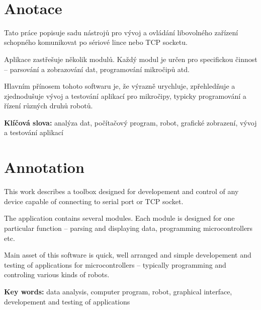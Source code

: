 \documentclass[12pt, a4paper, oneside]{article}
\newcommand{\D}{\medskip \noindent} %
\newcommand{\B}{\textbf} %
\begin{document}
\newpage   %
~ %
\vspace{10mm}

\section*{Anotace}


Tato práce popisuje sadu nástrojů pro vývoj a ovládání libovolného zařízení schopného komunikovat po sériové lince nebo TCP socketu.

Aplikace zastřešuje několik modulů. Každý modul je určen pro specifickou činnost -- parsování a zobrazování dat, programování mikročipů atd.

Hlavním přínosem tohoto softwaru je, že výrazně urychluje, zpřehledňuje a zjednodušuje vývoj a testování aplikací pro mikročipy, typicky programování a řízení různých druhů robotů.

\D \B{Klíčová slova:} analýza dat, počítačový program, robot, grafické zobrazení, vývoj a testování aplikací

\section*{Annotation}

This work describes a toolbox designed for developement and control of any device capable of connecting to serial port or TCP socket.

The application contains several modules. Each module is designed for one particular function -- parsing and displaying data, programming microcontrollers etc.

Main asset of this software is quick, well arranged and simple developement and testing of applications for microcontrollers -- typically programming and controling various kinds of robots.

\D \B{Key words:} data analysis, computer program, robot, graphical interface, developement and testing of applications

\addtolength{\textheight}{30mm} %

\newpage
\pagestyle{plain}

\setlength{\voffset}{-20mm} %
\setcounter{page}{1}  %
\end{document}

